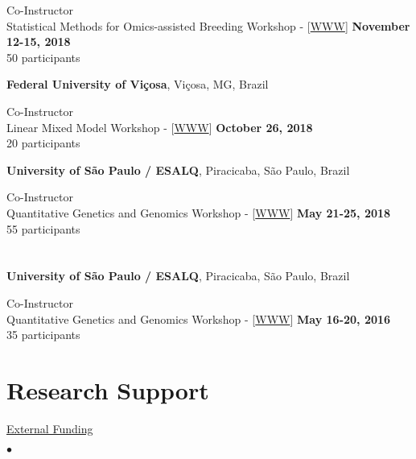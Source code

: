 \documentclass[margin,line,10pt]{res}
\newenvironment{list2}{
  \begin{list}{$\bullet$}{%
      \setlength{\itemsep}{0in}
      \setlength{\parsep}{0in} \setlength{\parskip}{0in}
      \setlength{\topsep}{0in} \setlength{\partopsep}{0in} 
      \setlength{\leftmargin}{0.2in}}}{\end{list}}
\begin{document}
\begin{resume}
Co-Instructor  \\
Statistical Methods for Omics-assisted Breeding Workshop - [\textcolor{blue}{\href{http://morotalab.org/UT2018/UT2018.html}{WWW}}]
\hfill {\bf November 12-15, 2018} \\
50 participants 



{\bf Federal University of Vi\c cosa}, Vi\c cosa, MG, Brazil
\vspace{.01pt}

Co-Instructor  \\
Linear Mixed Model Workshop - [\textcolor{blue}{\href{http://morotalab.org/UFV2018/UFV2018.html}{WWW}}]
\hfill {\bf October 26, 2018} \\
20 participants


{\bf University of S\~{a}o Paulo / ESALQ}, Piracicaba, S\~{a}o Paulo, Brazil
\vspace{.01pt}

Co-Instructor  \\
Quantitative Genetics and Genomics Workshop - [\textcolor{blue}{\href{http://morotalab.org/ESALQ2018/ESALQ2018.html}{WWW}}]
\hfill {\bf May 21-25, 2018} \\
55 participants


\section{}


{\bf University of S\~{a}o Paulo / ESALQ}, Piracicaba, S\~{a}o Paulo, Brazil
\vspace{.01pt}


Co-Instructor  \\
Quantitative Genetics and Genomics Workshop - [\textcolor{blue}{\href{http://morotalab.org/ESALQ2016/ESALQ2016.html}{WWW}}]
\hfill {\bf May 16-20, 2016} \\
35 participants  






\vspace{0.5cm}
\section{\sc Research Support}
\begin{flushleft}
\hspace{0.2cm} \underline{External Funding}
\end{flushleft}

\begin{list2}


\end{list2}
\end{resume}
\end{document}
